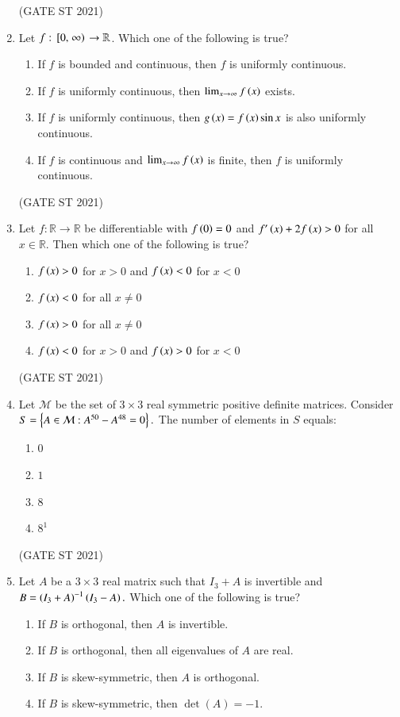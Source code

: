 \documentclass[journal,12pt,onecolumn]{IEEEtran}
\theoremstyle{remark}
\begin{document}
\begin{enumerate}
\hfill (GATE ST 2021) \\

\item
Let $f: {}\left[0, \left.\infty\right)\right. \to \mathbb{R}$. Which one of the following is true?
\begin{enumerate}
\item If $f$ is bounded and continuous, then $f$ is uniformly continuous.
\item If $f$ is uniformly continuous, then $\lim_{x \to \infty} f\left(x\right)$ exists.
\item If $f$ is uniformly continuous, then $g\left(x\right) = f\left(x\right) \sin x$ is also uniformly continuous.
\item If $f$ is continuous and $\lim_{x \to \infty} f\left(x\right)$ is finite, then $f$ is uniformly continuous.
\end{enumerate}

\hfill (GATE ST 2021) \\
\item
Let $f: \mathbb{R} \to \mathbb{R}$ be differentiable with $f\left(0\right) = 0$ and $f'\left(x\right) + 2f\left(x\right) > 0$ for all $x \in \mathbb{R}$. Then which one of the following is true?
\begin{enumerate}
\item $f\left(x\right) > 0$ for $x > 0$ and $f\left(x\right) < 0$ for $x < 0$
\item $f\left(x \right)< 0$ for all $x \neq 0$
\item $f\left(x\right) > 0$ for all $x \neq 0$
\item $f\left(x\right) < 0$ for $x > 0$ and $f\left(x\right) > 0$ for $x < 0$
\end{enumerate}

\hfill (GATE ST 2021) \\
\item
Let $\mathcal{M}$ be the set of $3\times 3$ real symmetric positive definite matrices. Consider  
$
S = \left\{ A \in \mathcal{M} : A^{50} - A^{48} = 0 \right\}.
$
The number of elements in $S$ equals:
\begin{enumerate}
\item $0$
\item $1$
\item $8$
\item $8^1$
\end{enumerate}

\hfill (GATE ST 2021) \\

\item
Let $A$ be a $3\times 3$ real matrix such that $I_3 + A$ is invertible and
$
B = \left(I_3 + A\right)^{-1}\left(I_3 - A\right).
$
Which one of the following is true?
\begin{enumerate}
\item If $B$ is orthogonal, then $A$ is invertible.
\item If $B$ is orthogonal, then all eigenvalues of $A$ are real.
\item If $B$ is skew-symmetric, then $A$ is orthogonal.
\item If $B$ is skew-symmetric, then $\det(A) = -1$.
\end{enumerate}


\end{enumerate}
\end{document}
